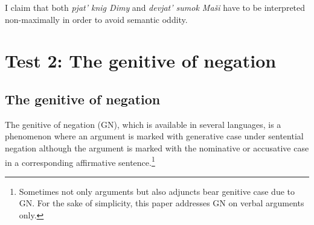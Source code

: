 \documentclass[output=paper]{langscibook}
\begin{document}
\noindent I claim that both \textit{pjat' knig Dimy} and \textit{devjat' sumok Maši} have to be interpreted non-maximally in order to avoid semantic oddity.

\section{Test 2: The genitive of negation}\label{secGN}

\subsection{The genitive of negation}

The genitive of negation (GN), which is available in several  languages, is a phenomenon where an argument is marked with generative case under sentential negation although the argument is marked with the nominative or accusative case in a corresponding affirmative sentence.\footnote{Sometimes not only arguments but also adjuncts bear genitive case due to GN. For the sake of simplicity, this paper addresses GN on verbal arguments only.}
\end{document}
